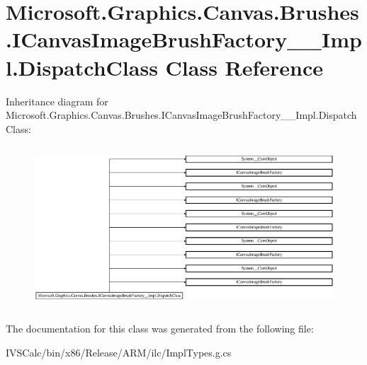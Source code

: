 \hypertarget{class_microsoft_1_1_graphics_1_1_canvas_1_1_brushes_1_1_i_canvas_image_brush_factory_____impl_1_1_dispatch_class}{}\section{Microsoft.\+Graphics.\+Canvas.\+Brushes.\+I\+Canvas\+Image\+Brush\+Factory\+\_\+\+\_\+\+Impl.\+Dispatch\+Class Class Reference}
\label{class_microsoft_1_1_graphics_1_1_canvas_1_1_brushes_1_1_i_canvas_image_brush_factory_____impl_1_1_dispatch_class}
Inheritance diagram for Microsoft.\+Graphics.\+Canvas.\+Brushes.\+I\+Canvas\+Image\+Brush\+Factory\+\_\+\+\_\+\+Impl.\+Dispatch\+Class\+:\begin{figure}[H]
\begin{center}
\leavevmode
\includegraphics[height=6.099010cm]{class_microsoft_1_1_graphics_1_1_canvas_1_1_brushes_1_1_i_canvas_image_brush_factory_____impl_1_1_dispatch_class}
\end{center}
\end{figure}


The documentation for this class was generated from the following file\+:\begin{DoxyCompactItemize}
\item 
I\+V\+S\+Calc/bin/x86/\+Release/\+A\+R\+M/ilc/Impl\+Types.\+g.\+cs\end{DoxyCompactItemize}
